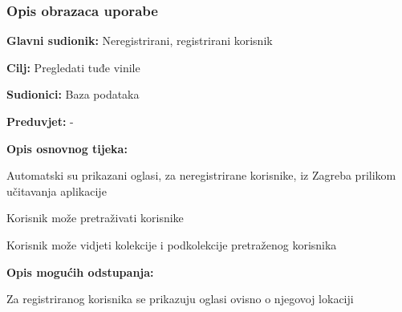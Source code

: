 				\subsubsection{Opis obrazaca uporabe}
					

					\noindent {}
					\begin{packed_item}
	
						\item \textbf{Glavni sudionik: }Neregistrirani, registrirani korisnik
						\item  \textbf{Cilj:} Pregledati tuđe vinile
						\item  \textbf{Sudionici:} Baza podataka
						\item  \textbf{Preduvjet:} -
						\item  \textbf{Opis osnovnog tijeka:}
						
						\item[] \begin{packed_enum}
	
							\item Automatski su prikazani oglasi, za neregistrirane korisnike, iz Zagreba prilikom učitavanja aplikacije
							\item Korisnik može pretraživati korisnike
							\item Korisnik može vidjeti kolekcije i podkolekcije pretraženog korisnika

						\end{packed_enum}
						
						\item  \textbf{Opis mogućih odstupanja:}
						
						\item[] \begin{packed_item}
	
							\item[1.a] Za registriranog korisnika se prikazuju oglasi ovisno o njegovoj lokaciji
							
						\end{packed_item}						
					\end{packed_item}
					
